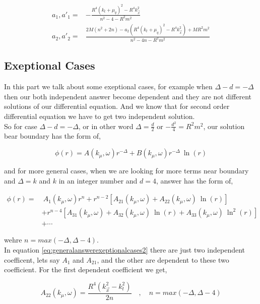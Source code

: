 \begin{align}
    a_1 , a'_1 =& -\frac{R^4(k_t+\mu_q)^2 - R^4k^2_{\vec{x}}}{n^2-4- R^2m^2}\nonumber\\
    a_2 , a'_2 =&  \frac{2M(n^2+2n)-a_2\left(R^4(k_t+\mu_q)^2 - R^4k^2_{\vec{x}}\right) + MR^2m^2}{n^2-4n - R^2m^2}
\end{align}


\subsection{Exeptional Cases}
In this part we talk about some exeptional cases, for example when $\Delta-d=-\Delta$ then our both independent answer become dependent and they are not different solutions of our differential equation. And we know that for second order differential equation we have to get two independent solution.\\

So for case $\Delta-d=-\Delta$, or in other word $\Delta = \frac{d}{2}$ or $-\frac{d^2}{4} = R^2m^2$, our solution bear boundary has the form of, 

\begin{equation}
   \phi(r) = A(k_{\mu},\omega)r^{-\Delta} + B(k_{\mu},\omega)r^{-\Delta}~\ln{(r)}
\end{equation}

and for more general cases, when we are looking for more terms near boundary and $\Delta=k$ and $k$ in an integer number and $d = 4$, answer has the form of,

\begin{align} \label{eq:generalanswerexeptionalcases2}
   \phi(r) =&~A_1(k_{\mu},\omega)r^{n} + r^{n-2}\left[A_{21}(k_{\mu},\omega) + A_{22}(k_{\mu},\omega)~\ln{(r)}\right] \nonumber\\
    &+ r^{n-4}\left[A_{31}(k_{\mu},\omega) + A_{32}(k_{\mu},\omega)~\ln{(r)} + A_{33}(k_{\mu},\omega)~\ln^2{(r)}\right] \nonumber\\
    &+ \cdots 
\end{align}

wehre $n = max(-\Delta,\Delta-4)$.\\

In equation \ref{eq:generalanswerexeptionalcases2} there are just two independent coefficent, lets say $A_1$ and $A_{21}$, and the other are dependent to these two coefficient. For the first dependent coefficient we get,

\begin{equation}
   A_{22}(k_{\mu},\omega) = \frac{R^4(k^2_{\vec{x}} - k^2_t)}{2n} \quad , \quad n = max(-\Delta,\Delta-4)
\end{equation}

